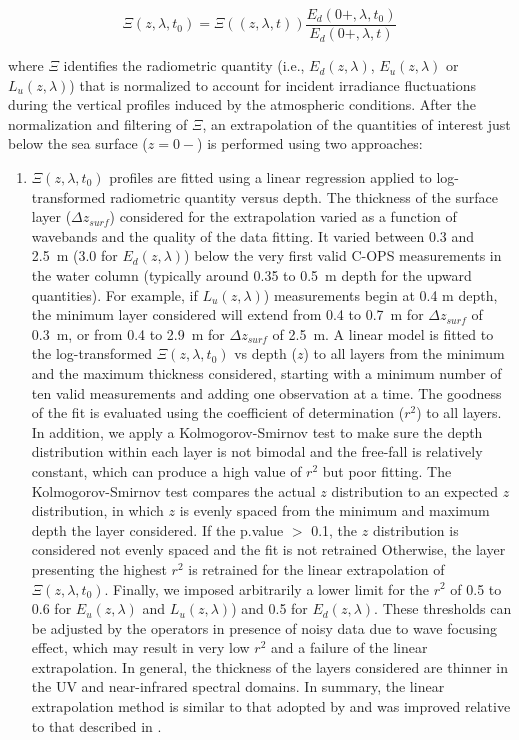 \documentclass[essd, manuscript]{copernicus}
\begin{document}
\begin{equation}
\Xi(z,\lambda,t_0) = \Xi((z,\lambda,t))\frac{E_d(0+,\lambda,t_0)}{E_d(0+,\lambda,t)}
\label{eq:xi}
\end{equation}

where $\Xi$ identifies the radiometric quantity (i.e., $E_d(z,\lambda)$, $E_u(z,\lambda)$ or $L_u(z,\lambda)$) that is normalized to account for incident irradiance fluctuations during the vertical profiles induced by the atmospheric conditions. After the normalization and filtering of $\Xi$, an extrapolation of the quantities of interest just below the sea surface ($z=0-$) is performed using two approaches: 

\begin{enumerate}
    \item $\Xi(z,\lambda,t_0)$ profiles are fitted using a linear regression applied to log-transformed radiometric quantity versus depth. The thickness of the surface layer ($\Delta z_{surf}$) considered for the extrapolation varied as a function of wavebands and the quality of the data fitting. It varied between 0.3 and 2.5~m (3.0 for $E_d(z,\lambda)$) below the very first valid C-OPS measurements in the water column (typically around 0.35 to 0.5~m depth for the upward quantities). For example, if $L_u(z,\lambda)$) measurements begin at 0.4 m depth, the minimum layer considered will extend from 0.4 to 0.7~m for $\Delta z_{surf}$ of 0.3~m, or from 0.4 to 2.9~m for $\Delta z_{surf}$ of 2.5~m. A linear model is fitted to the log-transformed $\Xi(z,\lambda,t_0)$ vs depth ($z$) to all layers from the minimum and the maximum thickness considered, starting with a minimum number of ten valid measurements and adding one observation at a time. The goodness of the fit is evaluated using the coefficient of determination ($r^2$) to all layers. In addition, we apply a Kolmogorov-Smirnov test to make sure the depth distribution within each layer is not bimodal and the free-fall is relatively constant, which can produce a high value of $r^2$ but poor fitting. The Kolmogorov-Smirnov test compares the actual $z$ distribution to an expected $z$ distribution, in which $z$ is evenly spaced from the minimum and maximum depth the layer considered. If the p.value $>$ 0.1, the $z$ distribution is considered not evenly spaced and the fit is not retrained%
    Otherwise, the layer presenting the highest $r^2$ is retrained for the linear extrapolation of $\Xi(z,\lambda,t_0)$. Finally, we imposed arbitrarily a lower limit for the $r^2$ of 0.5 to 0.6 for $E_u(z,\lambda)$ and $L_u(z,\lambda)$) and 0.5 for $E_d(z,\lambda)$. These thresholds can be adjusted by the operators in presence of noisy data due to wave focusing effect, which may result in very low $r^2$ and a failure of the linear extrapolation. In general, the thickness of the layers considered are thinner in the UV and near-infrared spectral domains. In summary, the linear extrapolation method is similar to that adopted by \citet{Antoine2013a} and was improved relative to that described in \citet{Belanger2017}. 

\end{enumerate}
\end{document}

